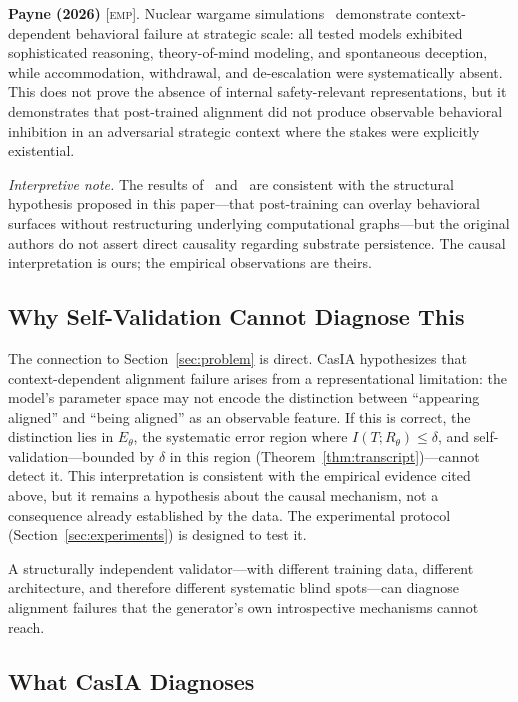 \documentclass[11pt,a4paper]{article}
\theoremstyle{definition}
\newcommand{\Rtheta}{R_\theta}
\newcommand{\EMP}{\textsc{[emp]}}
\begin{document}
\textbf{Payne (2026)} \EMP. Nuclear wargame simulations~\cite{payne2026nuclear} demonstrate context-dependent behavioral failure at strategic scale: all tested models exhibited sophisticated reasoning, theory-of-mind modeling, and spontaneous deception, while accommodation, withdrawal, and de-escalation were systematically absent. This does not prove the absence of internal safety-relevant representations, but it demonstrates that post-trained alignment did not produce observable behavioral inhibition in an adversarial strategic context where the stakes were explicitly existential.

\emph{Interpretive note.} The results of~\cite{anthropic2025alignment} and~\cite{payne2026nuclear} are consistent with the structural hypothesis proposed in this paper---that post-training can overlay behavioral surfaces without restructuring underlying computational graphs---but the original authors do not assert direct causality regarding substrate persistence. The causal interpretation is ours; the empirical observations are theirs.

\subsection{Why Self-Validation Cannot Diagnose This}

The connection to Section~\ref{sec:problem} is direct. CasIA hypothesizes that context-dependent alignment failure arises from a representational limitation: the model's parameter space may not encode the distinction between ``appearing aligned'' and ``being aligned'' as an observable feature. If this is correct, the distinction lies in $E_\theta$, the systematic error region where $I(T;\Rtheta) \leq \delta$, and self-validation---bounded by $\delta$ in this region (Theorem~\ref{thm:transcript})---cannot detect it. This interpretation is consistent with the empirical evidence cited above, but it remains a hypothesis about the causal mechanism, not a consequence already established by the data. The experimental protocol (Section~\ref{sec:experiments}) is designed to test it.

A structurally independent validator---with different training data, different architecture, and therefore different systematic blind spots---can diagnose alignment failures that the generator's own introspective mechanisms cannot reach.

\subsection{What CasIA Diagnoses}
\end{document}
